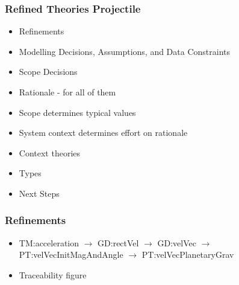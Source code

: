 \documentclass[t,12pt,numbers,fleqn]{beamer}
\begin{document}


\begin{frame}
\frametitle{Refined Theories Projectile}

\begin{itemize}
\item Refinements
\item Modelling Decisions, Assumptions, and Data Constraints
\item Scope Decisions
\item Rationale - for all of them
\item Scope determines typical values
\item System context determines effort on rationale
\item Context theories
\item Types
\item Next Steps
\end{itemize}

\end{frame}


\begin{frame}
\frametitle{Refinements}

\begin{itemize}

\item TM:acceleration $\rightarrow$ GD:rectVel $\rightarrow$ GD:velVec $\rightarrow$ PT:velVecInitMagAndAngle $\rightarrow$ PT:velVecPlanetaryGrav 
\item Traceability figure
\end{itemize}

\end{frame}

\end{document}
